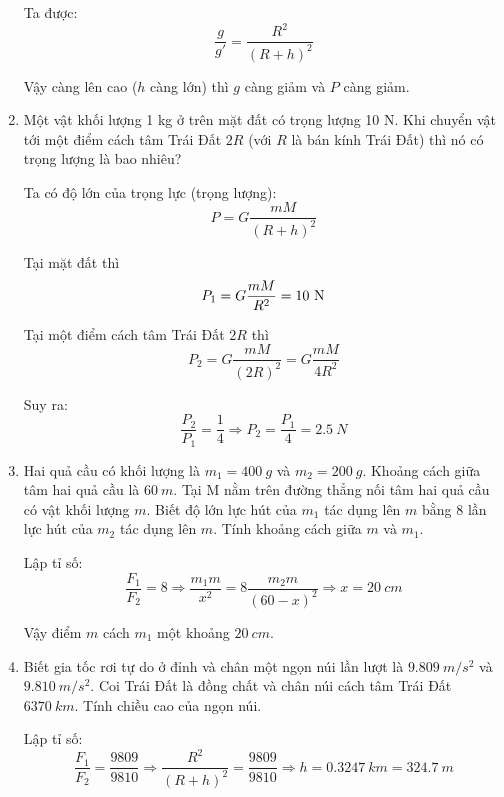 \begin{enumerate}[label=\bfseries Câu \arabic*:]
{	Ta được:
	$$\dfrac{g}{g'} = \dfrac{R^2}{(R+h)^2}$$
	
	Vậy càng lên cao ($h$ càng lớn) thì $g$ càng giảm và $P$ càng giảm.
	}
	\item {}
	
	\cauhoi
	{Một vật khối lượng 1 kg ở trên mặt đất có trọng lượng 10 N. Khi chuyển vật tới một điểm cách tâm Trái Đất $2R$ (với $R$ là bán kính Trái Đất) thì nó có trọng lượng là bao nhiêu?	}
	
	\loigiai
	{Ta có độ lớn của trọng lực (trọng lượng):
		$$P=G\dfrac{mM}{(R+h)^2}$$
		
		Tại mặt đất thì
		$$P_1 = G\dfrac{mM}{R^2} = 10\ \text N$$
		
		Tại một điểm cách tâm Trái Đất $2R$ thì
		$$P_2=G\dfrac{mM}{(2R)^2} = G\dfrac{mM}{4R^2}$$
		
		Suy ra:
		$$\dfrac{P_2}{P_1} = \dfrac{1}{4} \Rightarrow P_2 = \dfrac{P_1}{4} = \SI{2.5}{N}$$
	}
	\item {}
	
	\cauhoi
	{Hai quả cầu có khối lượng là $m_1=\SI{400}{g}$ và $m_2=\SI{200}{g}$. Khoảng cách giữa tâm hai quả cầu là $\SI{60}{m}$. Tại M nằm trên đường thẳng nối tâm hai quả cầu có vật khối lượng $m$. Biết độ lớn lực hút của $m_1$ tác dụng lên $m$ bằng 8 lần lực hút của $m_2$ tác dụng lên $m$. Tính khoảng cách giữa $m$ và $m_1$.
	}
	
	\loigiai
	{Lập tỉ số:
		$$\dfrac{F_1}{F_2} = 8 \Rightarrow \dfrac{m_1 m}{x^2} = 8 \dfrac{m_2 m}{(60-x)^2} \Rightarrow x = \SI{20}{cm}$$
		
	Vậy điểm $m$ cách $m_1$ một khoảng $\SI{20}{cm}$.
	}
	\item {}
	
	\cauhoi
	{Biết gia tốc rơi tự do ở đỉnh và chân một ngọn núi lần lượt là $\SI{9.809}{m/s^2}$ và $\SI{9.810}{m/s^2}$. Coi Trái Đất là đồng chất và chân núi cách tâm Trái Đất $\SI{6370}{km}$. Tính chiều cao của ngọn núi.
	}
	
	\loigiai
	{Lập tỉ số:
		$$\dfrac{F_1}{F_2}=\dfrac{9809}{9810} \Rightarrow \dfrac{R^2}{(R+h)^2} = \dfrac{9809}{9810} \Rightarrow h = \SI{0.3247}{km} = \SI{324.7}{m}$$
	}
\end{enumerate}
